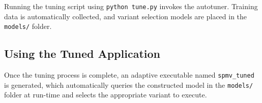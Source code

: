 \documentclass[12pt]{article}
\begin{document}
Running the tuning script using \texttt{python tune.py} invokes the autotuner. Training data is automatically
collected, and variant selection models are placed in the \texttt{models/} folder.

\subsection{Using the Tuned Application}

Once the tuning process is complete, an adaptive executable named \texttt{spmv\_tuned} is generated, which
automatically queries the constructed model in the \texttt{models/} folder at run-time and selects
the appropriate variant to execute.
\end{document}

